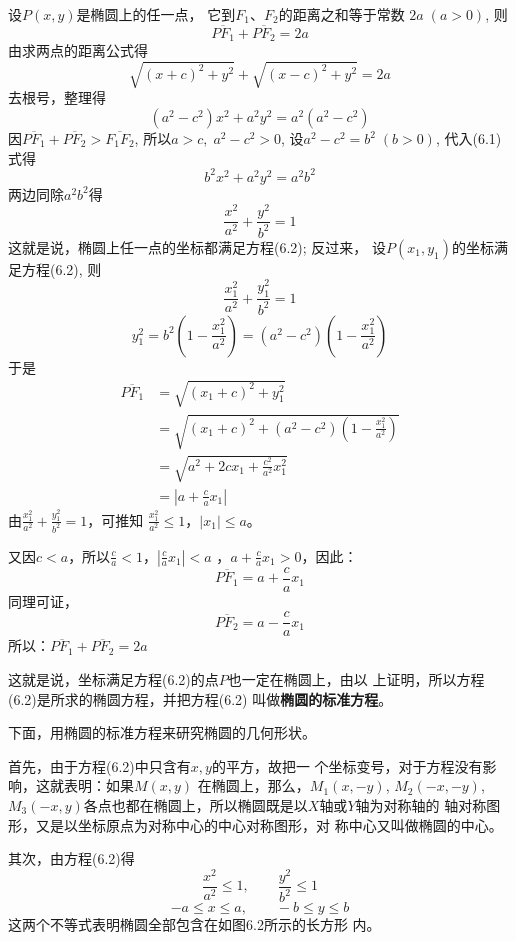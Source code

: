设$P(x,y)$是椭圆上的任一点，
它到$F_1$、$F_2$的距离之和等于常数
$2a\; (a>0)$, 则
\[\overline{PF_1}+\overline{PF_2}=2a\]
由求两点的距离公式得
\[\sqrt{(x+c)^2+y^2}+\sqrt{(x-c)^2+y^2}=2a\]
去根号，整理得
\begin{equation}
    (a^2-c^2)x^2+a^2y^2=a^2(a^2-c^2)
\end{equation}
因$\overline{PF_1}+\overline{PF_2}>\overline{F_1F_2}$, 所以$a>c,\; a^2-c^2>0$, 
设$a^2-c^2=b^2\; (b>0)$, 代入(6.1)式得
\[b^2x^2+a^2y^2=a^2b^2\]
两边同除$a^2b^2$得
\begin{equation}
 \boxed{\frac{x^2}{a^2}+\frac{y^2}{b^2}=1}   
\end{equation}
这就是说，椭圆上任一点的坐标都满足方程(6.2); 反过来，
设$P(x_1,y_1)$的坐标满足方程(6.2), 则
\[\frac{x_1^2}{a^2}+\frac{y_1^2}{b^2}=1\]
\[y^2_1=b^2\left(1-\frac{x^2_1}{a^2}\right)=(a^2-c^2)\left(1-\frac{x^2_1}{a^2}\right)\]
于是
\[\begin{split}
    \overline{PF_1}&=\sqrt{(x_1+c)^2+y^2_1}\\
    &=\sqrt{(x_1+c)^2+(a^2-c^2)\left(1-\frac{x^2_1}{a^2}\right)}\\
    &=\sqrt{a^2+2cx_1+\frac{c^2}{a^2}x^2_1}\\
    &=\left|a+\frac{c}{a}x_1\right|
\end{split}\]
由$\frac{x_1^2}{a^2}+\frac{y_1^2}{b^2}=1$，可推知
$\frac{x_1^2}{a^2}\le 1$，$|x_1|\le a$。

又因$c<a$，所以$\frac{c}{a}<1$，$\left|\frac{c}{a}x_1\right|<a$
，$a+\frac{c}{a}x_1>0$，因此：
\begin{equation}
    \overline{PF_1}=a+\frac{c}{a}x_1
\end{equation}
同理可证，
\[\overline{PF_2}=a-\frac{c}{a}x_1\]
所以：$\overline{PF_1}+\overline{PF_2}=2a$

这就是说，坐标满足方程(6.2)的点$P$也一定在椭圆上，由以
上证明，所以方程(6.2)是所求的椭圆方程，并把方程(6.2)
叫做\textbf{椭圆的标准方程}。

下面，用椭圆的标准方程来研究椭圆的几何形状。

首先，由于方程(6.2)中只含有$x,y$的平方，故把一
个坐标变号，对于方程没有影响，这就表明：如果$M(x,y)$
在椭圆上，那么，$M_1(x,-y)$, $M_2(-x,-y)$, $M_3(-x,
y)$各点也都在椭圆上，所以椭圆既是以$X$轴或$Y$轴为对称轴的
轴对称图形，又是以坐标原点为对称中心的中心对称图形，对
称中心又叫做椭圆的中心。

其次，由方程(6.2)得
\[\frac{x^2}{a^2}\le 1,\qquad \frac{y^2}{b^2}\le 1\]
\[-a\le x\le a,\qquad -b\le y\le b\]
这两个不等式表明椭圆全部包含在如图6.2所示的长方形
内。

